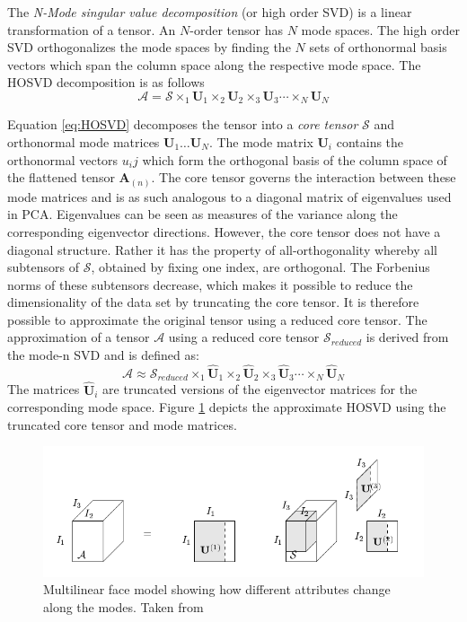 \documentclass[11pt,a4paper]{report}
\begin{document}
The \textit{N-Mode singular value decomposition} (or high order SVD) is a linear
transformation of a tensor. An $N$-order tensor has $N$ mode spaces. The high
order SVD orthogonalizes the mode spaces by finding the $N$ sets of orthonormal basis vectors
which span the column space along the respective mode space. The HOSVD
decomposition is as follows \cite{multilinear}
\begin{equation}\label{eq:HOSVD}
\mathcal{A} = \mathcal{S} \times_1 \mathbf{U}_1 \times_2
\mathbf{U}_2 \times_3 \mathbf{U}_3 \dotsb \times_N \mathbf{U}_N
\end{equation}

Equation \ref{eq:HOSVD} decomposes the tensor into a \textit{core
  tensor} $\mathcal{S}$ and orthonormal mode matrices $\mathbf{U}_1 \ldots
\mathbf{U}_N$. The mode matrix $\mathbf{U}_i$ contains the orthonormal vectors
$u_ij$ which form the orthogonal basis of the column space of the flattened
tensor $\mathbf{A}_{(n)}$. The core tensor governs the interaction between these
mode matrices and is as such analogous to a diagonal matrix of eigenvalues used
in PCA. Eigenvalues can be seen as measures of the variance along the
corresponding eigenvector directions. However, the core tensor does not have a
diagonal structure. Rather it has the property of all-orthogonality whereby all
subtensors of $\mathcal{S}$, obtained by fixing one index, are orthogonal. The
Forbenius norms of these subtensors decrease, which makes it possible to reduce the dimensionality of
the data set by truncating the core tensor. It is therefore possible to
approximate the original tensor using a reduced core tensor. The approximation
of a tensor
$\mathcal{A}$ using a reduced core tensor $\mathcal{S}_{reduced}$ is derived from the
mode-n SVD and is defined as:
\begin{equation} \label{eq:core_tensor}
\mathcal{A} \approx \mathcal{S}_{reduced} \times_1 \hat{\mathbf{U}}_1 \times_2
\hat{\mathbf{U}}_2 \times_3 \hat{\mathbf{U}}_3 \dotsb \times_N \hat{\mathbf{U}}_N
\end{equation}
The matrices $\hat{\mathbf{U}}_i$ are truncated versions of the eigenvector
matrices for the corresponding mode space. Figure \ref{fg:hosvd} depicts the
approximate HOSVD using the truncated core tensor and mode matrices.

\begin{figure}[H]
\centering
\includegraphics[scale=0.755]{images/n_mode_svd2.png}
\caption{Multilinear face model showing how different attributes change along
  the modes. Taken from \cite{multilinear} }
\label{fg:hosvd}
\end{figure}
\end{document}
